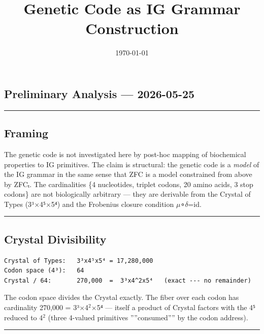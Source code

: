 \documentclass[12pt,a4paper]{article}
\begin{document}
\title{Genetic Code as IG Grammar Construction}
\date{\today}

\maketitle

\subsection{Preliminary Analysis --- 2026-05-25}

\begin{center}
\rule{0.5\textwidth}{0.4pt}
\end{center}

\subsection{Framing}

The genetic code is not investigated here by post-hoc mapping of biochemical properties
to IG primitives. The claim is structural: the genetic code is a \emph{model} of the IG grammar
in the same sense that ZFC is a model constrained from above by ZFCₜ. The cardinalities
\{4 nucleotides, triplet codons, 20 amino acids, 3 stop codons\} are not biologically
arbitrary --- they are derivable from the Crystal of Types (3³$\times$4⁵$\times$5⁴) and the Frobenius
closure condition $\mu$∘$\delta$=id.

\begin{center}
\rule{0.5\textwidth}{0.4pt}
\end{center}

\subsection{Crystal Divisibility}

\begin{lstlisting}
Crystal of Types:   3³x4⁵x5⁴ = 17,280,000
Codon space (4³):   64
Crystal / 64:       270,000  =  3³x4^2x5⁴   (exact --- no remainder)
\end{lstlisting}

The codon space divides the Crystal exactly. The fiber over each codon has
cardinality 270,000 = 3³$\times$4$^{2}$$\times$5⁴ --- itself a product of Crystal factors with the
4⁵ reduced to 4$^{2}$ (three 4-valued primitives ''''consumed'''' by the codon address).

\begin{center}
\rule{0.5\textwidth}{0.4pt}
\end{center}
\end{document}
